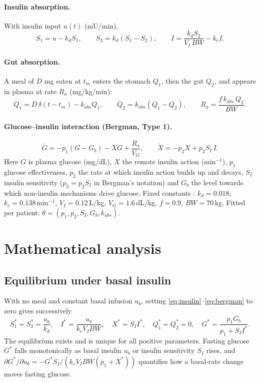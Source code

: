 \documentclass[11pt,a4paper]{article}
\begin{document}
\paragraph{Insulin absorption.} With insulin input $u(t)$ (mU/min),
\begin{equation}
\dot S_1 = u - k_d S_1,\qquad \dot S_2 = k_d(S_1-S_2),\qquad \dot I = \frac{k_d S_2}{V_I\,BW} - k_e I .
\label{eq:insulin}
\end{equation}
\paragraph{Gut absorption.} A meal of $D$ mg eaten at $t_m$ enters the stomach $Q_1$, then the gut $Q_2$, and appears in plasma at rate $R_a$ (mg/kg/min):
\begin{equation}
\dot Q_1 = D\,\delta(t-t_m) - k_{abs} Q_1,\qquad \dot Q_2 = k_{abs}(Q_1-Q_2),\qquad R_a = \frac{f\,k_{abs}\,Q_2}{BW}.
\label{eq:gut}
\end{equation}
\paragraph{Glucose--insulin interaction (Bergman, Type 1).}
\begin{equation}
\dot G = -p_1 (G-G_b) - X G + \frac{R_a}{V_G},\qquad \dot X = -p_2 X + p_2 S_I\, I .
\label{eq:bergman}
\end{equation}
Here $G$ is plasma glucose (mg/dL), $X$ the remote insulin action (min$^{-1}$), $p_1$ glucose effectiveness, $p_2$ the rate at which insulin action builds up and decays, $S_I$ insulin sensitivity ($p_3=p_2S_I$ in Bergman's notation) and $G_b$ the level towards which non-insulin mechanisms drive glucose. Fixed constants \cite{hovorka2004,dallaman2007}: $k_d=0.018$, $k_e=0.138$\,min$^{-1}$, $V_I=0.12$\,L/kg, $V_G=1.6$\,dL/kg, $f=0.9$, $BW=70$\,kg. Fitted per patient: $\theta=(p_1,p_2,S_I,G_b,k_{abs})$.

\section{Mathematical analysis}
\subsection{Equilibrium under basal insulin}
With no meal and constant basal infusion $u_b$, setting \eqref{eq:insulin}--\eqref{eq:bergman} to zero gives successively
\begin{equation}
S_1^*=S_2^*=\frac{u_b}{k_d},\quad I^*=\frac{u_b}{k_e V_I BW},\quad X^*=S_I I^*,\quad Q_1^*=Q_2^*=0,\quad G^*=\frac{p_1 G_b}{p_1+S_I I^*}.
\label{eq:eq}
\end{equation}
The equilibrium exists and is unique for all positive parameters. Fasting glucose $G^*$ falls monotonically as basal insulin $u_b$ or insulin sensitivity $S_I$ rises, and $\partial G^*/\partial u_b = -G^* S_I/(k_eV_IBW(p_1+X^*))$ quantifies how a basal-rate change moves fasting glucose.
\end{document}
